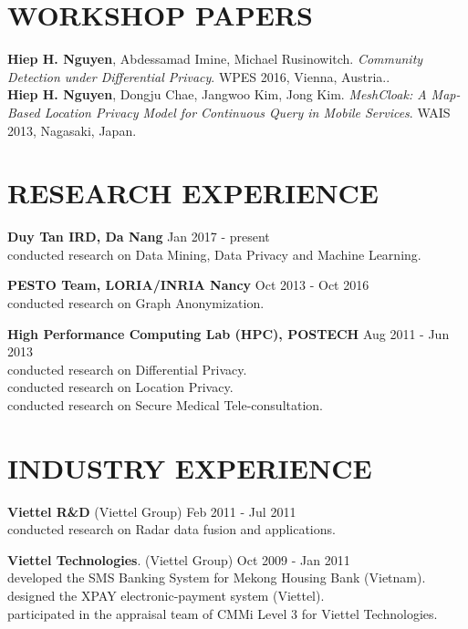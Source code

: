 \documentclass[margin, 10pt]{res} %
\begin{document}
\begin{resume}
\section{WORKSHOP PAPERS}
\textbf{Hiep H. Nguyen}, Abdessamad Imine, Michael Rusinowitch. \textit{Community Detection under Differential Privacy}. WPES 2016, Vienna, Austria.. \\
\textbf{Hiep H. Nguyen}, Dongju Chae, Jangwoo Kim, Jong Kim. \textit{MeshCloak: A Map-Based Location Privacy Model for Continuous Query in Mobile Services}. WAIS 2013, Nagasaki, Japan.



\section{RESEARCH EXPERIENCE}
\textbf{Duy Tan IRD, Da Nang} \hfill Jan 2017 - present \\
conducted research on Data Mining, Data Privacy and Machine Learning.

\textbf{PESTO Team, LORIA/INRIA Nancy} \hfill Oct 2013 - Oct 2016 \\
conducted research on Graph Anonymization.	

\textbf{High Performance Computing Lab (HPC), POSTECH}	\hfill Aug 2011 - Jun 2013 \\
conducted research on Differential Privacy.	\\
conducted research on Location Privacy. \\
conducted research on Secure Medical Tele-consultation. 



\section{INDUSTRY EXPERIENCE}

\textbf{Viettel R\&D} (Viettel Group)		\hfill Feb 2011 - Jul 2011 \\
conducted research on Radar data fusion and applications.

\textbf{Viettel Technologies}. (Viettel Group)		\hfill Oct 2009 - Jan 2011 \\
developed the SMS Banking System for Mekong Housing Bank (Vietnam). \\
designed the XPAY electronic-payment system (Viettel). \\
participated in the appraisal team of CMMi Level 3 for Viettel Technologies.


\end{resume}
\end{document}
